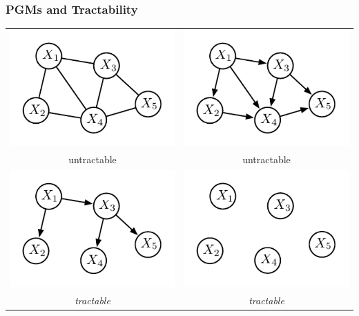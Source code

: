 \documentclass[xcolor={usenames,dvipsnames,svgnames}, compress]{beamer}
\begin{document}
\begin{frame}[t]
  \frametitle{PGMs and Tractability}
  \begin{table}[!ht]
    \setlength{\tabcolsep}{22pt}
    \centering
    \begin{tabular}{c c}
      
      \includegraphics[width=0.33\linewidth]{figures/mrf} &
                                                            \includegraphics[width=0.33\linewidth]{figures/bn}\\
      \scriptsize  untractable & \scriptsize untractable \\
      \includegraphics[width=0.33\linewidth]{figures/clt} &
      \includegraphics[width=0.33\linewidth]{figures/nf}\\
      \scriptsize \emph{tractable} & \scriptsize \emph{tractable}                                                              
    \end{tabular}
  \end{table}
\end{frame}
\end{document}

